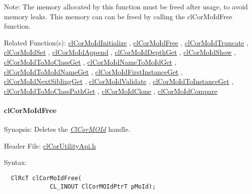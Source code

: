 \begin{Desc}
\item[Note:]The memory allocated by this function must be freed after usage, to avoid memory leaks. This memory can can be freed by calling the cl\-Cor\-Mo\-Id\-Free function.\end{Desc}
\begin{Desc}
\item[Related Function(s):]\hyperlink{group__group13}{cl\-Cor\-Mo\-Id\-Initialize} , \hyperlink{group__group13}{cl\-Cor\-Mo\-Id\-Free} , \hyperlink{group__group13}{cl\-Cor\-Mo\-Id\-Truncate} , \hyperlink{group__group13}{cl\-Cor\-Mo\-Id\-Set} , \hyperlink{group__group13}{cl\-Cor\-Mo\-Id\-Append} , \hyperlink{group__group13}{cl\-Cor\-Mo\-Id\-Depth\-Get} , \hyperlink{group__group13}{cl\-Cor\-Mo\-Id\-Show} , \hyperlink{group__group13}{cl\-Cor\-Mo\-Id\-To\-Mo\-Class\-Get} , \hyperlink{group__group13}{cl\-Cor\-Mo\-Id\-Name\-To\-Mo\-Id\-Get} , \hyperlink{group__group13}{cl\-Cor\-Mo\-Id\-To\-Mo\-Id\-Name\-Get} , \hyperlink{group__group13}{cl\-Cor\-Mo\-Id\-First\-Instance\-Get} , \hyperlink{group__group13}{cl\-Cor\-Mo\-Id\-Next\-Sibling\-Get} , \hyperlink{group__group13}{cl\-Cor\-Mo\-Id\-Validate} , \hyperlink{group__group13}{cl\-Cor\-Mo\-Id\-To\-Instance\-Get} , \hyperlink{group__group13}{cl\-Cor\-Mo\-Id\-To\-Mo\-Class\-Path\-Get} , \hyperlink{group__group13}{cl\-Cor\-Mo\-Id\-Clone} , \hyperlink{group__group13}{cl\-Cor\-Mo\-Id\-Compare} \end{Desc}
\hypertarget{pagecor230}{}\paragraph{cl\-Cor\-Mo\-Id\-Free}\label{pagecor230}
\begin{Desc}
\item[Synopsis:]Deletes the {\em \hyperlink{struct_cl_cor_m_o_id}{Cl\-Cor\-MOId}\/} handle.\end{Desc}
\begin{Desc}
\item[Header File:]\hyperlink{cl_cor_utility_api_8h}{cl\-Cor\-Utility\-Api.h}\end{Desc}
\begin{Desc}
\item[Syntax:]

\footnotesize\begin{verbatim}  ClRcT clCorMoIdFree(
             CL_INOUT ClCorMOIdPtrT pMoId);
\end{verbatim}
\normalsize
\end{Desc}
